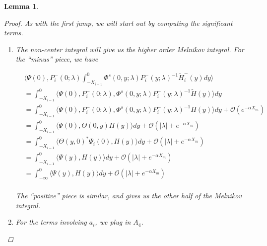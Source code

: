 \documentclass[12pt]{article}
\newtheorem{lemma}{Lemma}
\begin{document}
\begin{lemma}
\begin{proof}
As with the first jump, we will start out by computing the significant terms.

\begin{enumerate}
\item The non-center integral will give us the higher order Melnikov integral. For the ``minus'' piece, we have

\begin{align*}
&\langle \Psi(0), P_i^-(0; \lambda) \int_{-X_{i-1}}^0 \Phi^s(0, y; \lambda) P_i^-(y; \lambda)^{-1} \tilde{H}_i^-(y) dy \rangle \\
&= \int_{-X_{i-1}}^0 \langle \Psi(0), P_i^-(0; \lambda), \Phi^s(0, y; \lambda) P_i^-(y; \lambda)^{-1} \tilde{H}(y) \rangle dy \\
&= \int_{-X_{i-1}}^0 \langle \Psi(0), P_i^-(0; \lambda), \Phi^s(0, y; \lambda) P_i^-(y; \lambda)^{-1} H(y) \rangle dy + \mathcal{O}({e^{-\alpha X_m}})\\
&= \int_{-X_{i-1}}^0 \langle \Psi(0), \Theta(0, y) H(y) \rangle dy + \mathcal{O}(|\lambda| + {e^{-\alpha X_m}})\\
&= \int_{-X_{i-1}}^0 \langle \Theta(y, 0)^* \Psi_i(0), H(y) \rangle dy + \mathcal{O}(|\lambda| + {e^{-\alpha X_m}})\\
&= \int_{-X_{i-1}}^0 \langle \Psi(y), H(y) \rangle dy + \mathcal{O}(|\lambda| + {e^{-\alpha X_m}})\\
&= \int_{-\infty}^0 \langle \Psi(y), H(y) \rangle dy + \mathcal{O}(|\lambda| + {e^{-\alpha X_m}})\\
\end{align*}

The ``positive'' piece is similar, and gives us the other half of the Melnikov integral.

\item For the terms involving $a_i$, we plug in $A_4$.


\end{enumerate}
\end{proof}
\end{lemma}
\end{document}
